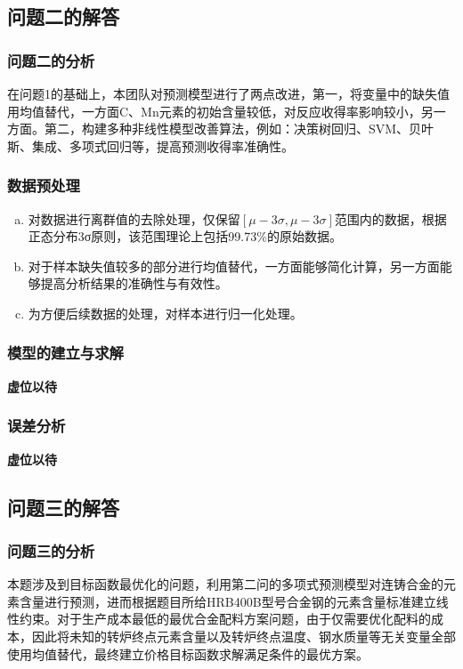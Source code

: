 \documentclass{xcumcmart}
\begin{document}
\subsection{问题二的解答}
\subsubsection{问题二的分析}
\par 在问题1的基础上，本团队对预测模型进行了两点改进，第一，将变量中的缺失值用均值替代，一方面C、Mn元素的初始含量较低，对反应收得率影响较小，另一方面。第二，构建多种非线性模型改善算法，例如：决策树回归、SVM、贝叶斯、集成、多项式回归等，提高预测收得率准确性。

\subsubsection{数据预处理}
\begin{enumerate}[(a)]
\setlength{\itemindent}{2em}    %
\item 对数据进行离群值的去除处理，仅保留$[\mu-3\sigma,\mu-3\sigma]$范围内的数据，根据正态分布3σ原则，该范围理论上包括99.73\%的原始数据。
\item 对于样本缺失值较多的部分进行均值替代，一方面能够简化计算，另一方面能够提高分析结果的准确性与有效性。
\item 为方便后续数据的处理，对样本进行归一化处理。
\end{enumerate}

\subsubsection{模型的建立与求解}
\textbf{虚位以待}
\subsubsection{误差分析}
\textbf{虚位以待}

\subsection{问题三的解答}
\subsubsection{问题三的分析}
\par 本题涉及到目标函数最优化的问题，利用第二问的多项式预测模型对连铸合金的元素含量进行预测，进而根据题目所给HRB400B型号合金钢的元素含量标准建立线性约束。对于生产成本最低的最优合金配料方案问题，由于仅需要优化配料的成本，因此将未知的转炉终点元素含量以及转炉终点温度、钢水质量等无关变量全部使用均值替代，最终建立价格目标函数求解满足条件的最优方案。
\end{document}
